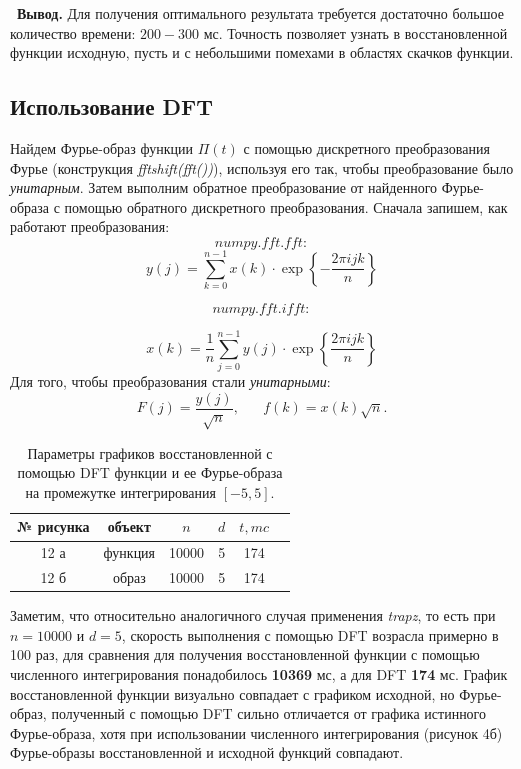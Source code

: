 \documentclass[a5paper, 10pt]{article}
\theoremstyle{definition}
\theoremstyle{plain}
\theoremstyle{remark}
\begin{document}
\newpage
\,
\newpage
\textbf{Вывод.} Для получения оптимального результата требуется достаточно большое количество времени: $200-300$ мс. Точность позволяет узнать в восстановленной функции исходную, пусть и с небольшими помехами в областях скачков функции. 












\newpage
\subsection{Использование DFT}
Найдем Фурье-образ функции $\Pi (t)$ с помощью дискретного преобразования Фурье (конструкция \textit{fftshift(fft())}), используя его так, чтобы преобразование было \textit{унитарным}. Затем выполним обратное преобразование от найденного Фурье-образа с помощью обратного дискретного преобразования. Сначала запишем, как работают преобразования:
$$numpy.fft.fft:$$
\begin{equation}
y(j) = \sum \limits_{k=0}^{n-1} x(k) \cdot \exp \left\{ - \frac{2\pi  i j k}{n} \right\}
\end{equation}

$$numpy.fft.ifft:$$

\begin{equation}
x(k) = \frac{1}{n} \sum \limits_{j=0}^{n-1} y(j) \cdot \exp \left\{ \frac{2\pi  i j k}{n} \right\}
\end{equation}
Для того, чтобы преобразования стали \textit{унитарными}:  $$F(j) = \frac{ y(j)}{\sqrt{n}} , \, \, \, \, \, \, \, \, \, \, f(k) = x(k)\sqrt{n}.$$


\begin{table}[h!]
\caption{Параметры графиков восстановленной с помощью DFT функции и ее Фурье-образа на промежутке интегрирования $[-5, 5]$.}
\label{tabular:timesandtenses}
\begin{center}
\begin{tabular}{|c|c|c|c|c|c|}
\hline
№ рисунка & объект& $n$ & $d$ & $t, mc$  \\
\hline
 12 а& функция & 10000 & 5 &  174\\
\hline
 12 б& образ & 10000 & 5& 174 \\
\hline
\end{tabular}
\end{center}
\end{table}

Заметим, что относительно аналогичного случая применения \textit{trapz}, то есть при $n = 10000$ и $d = 5$, скорость выполнения с помощью DFT возрасла примерно в 100 раз, для сравнения для получения восстановленной функции с помощью численного интегрирования понадобилось \textbf{10369} мс, а для DFT \textbf{174} мс. График восстановленной функции визуально совпадает с графиком исходной, но Фурье-образ, полученный с помощью DFT сильно отличается от графика истинного Фурье-образа, хотя при использовании численного интегрирования (рисунок 4б) Фурье-образы восстановленной и исходной функций совпадают.
\end{document}

